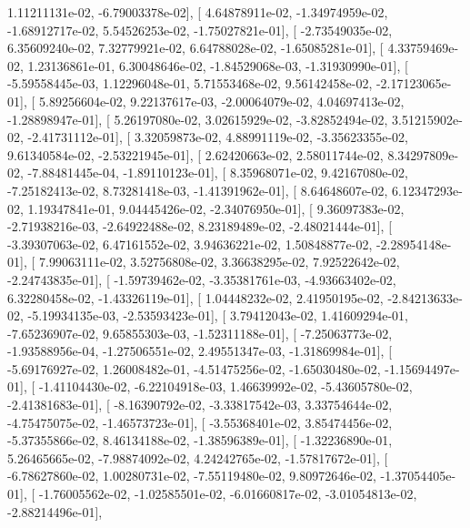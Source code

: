 \documentclass{article}
\begin{document}
          1.11211131e-02,  -6.79003378e-02],
       [  4.64878911e-02,  -1.34974959e-02,  -1.68912717e-02,
          5.54526253e-02,  -1.75027821e-01],
       [ -2.73549035e-02,   6.35609240e-02,   7.32779921e-02,
          6.64788028e-02,  -1.65085281e-01],
       [  4.33759469e-02,   1.23136861e-01,   6.30048646e-02,
         -1.84529068e-03,  -1.31930990e-01],
       [ -5.59558445e-03,   1.12296048e-01,   5.71553468e-02,
          9.56142458e-02,  -2.17123065e-01],
       [  5.89256604e-02,   9.22137617e-03,  -2.00064079e-02,
          4.04697413e-02,  -1.28898947e-01],
       [  5.26197080e-02,   3.02615929e-02,  -3.82852494e-02,
          3.51215902e-02,  -2.41731112e-01],
       [  3.32059873e-02,   4.88991119e-02,  -3.35623355e-02,
          9.61340584e-02,  -2.53221945e-01],
       [  2.62420663e-02,   2.58011744e-02,   8.34297809e-02,
         -7.88481445e-04,  -1.89110123e-01],
       [  8.35968071e-02,   9.42167080e-02,  -7.25182413e-02,
          8.73281418e-03,  -1.41391962e-01],
       [  8.64648607e-02,   6.12347293e-02,   1.19347841e-01,
          9.04445426e-02,  -2.34076950e-01],
       [  9.36097383e-02,  -2.71938216e-03,  -2.64922488e-02,
          8.23189489e-02,  -2.48021444e-01],
       [ -3.39307063e-02,   6.47161552e-02,   3.94636221e-02,
          1.50848877e-02,  -2.28954148e-01],
       [  7.99063111e-02,   3.52756808e-02,   3.36638295e-02,
          7.92522642e-02,  -2.24743835e-01],
       [ -1.59739462e-02,  -3.35381761e-03,  -4.93663402e-02,
          6.32280458e-02,  -1.43326119e-01],
       [  1.04448232e-02,   2.41950195e-02,  -2.84213633e-02,
         -5.19934135e-03,  -2.53593423e-01],
       [  3.79412043e-02,   1.41609294e-01,  -7.65236907e-02,
          9.65855303e-03,  -1.52311188e-01],
       [ -7.25063773e-02,  -1.93588956e-04,  -1.27506551e-02,
          2.49551347e-03,  -1.31869984e-01],
       [ -5.69176927e-02,   1.26008482e-01,  -4.51475256e-02,
         -1.65030480e-02,  -1.15694497e-01],
       [ -1.41104430e-02,  -6.22104918e-03,   1.46639992e-02,
         -5.43605780e-02,  -2.41381683e-01],
       [ -8.16390792e-02,  -3.33817542e-03,   3.33754644e-02,
         -4.75475075e-02,  -1.46573723e-01],
       [ -3.55368401e-02,   3.85474456e-02,  -5.37355866e-02,
          8.46134188e-02,  -1.38596389e-01],
       [ -1.32236890e-01,   5.26465665e-02,  -7.98874092e-02,
          4.24242765e-02,  -1.57817672e-01],
       [ -6.78627860e-02,   1.00280731e-02,  -7.55119480e-02,
          9.80972646e-02,  -1.37054405e-01],
       [ -1.76005562e-02,  -1.02585501e-02,  -6.01660817e-02,
         -3.01054813e-02,  -2.88214496e-01],
\end{document}
